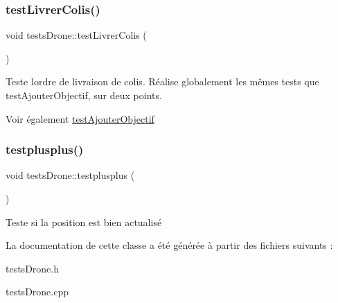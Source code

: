 \subsubsection{\texorpdfstring{test\+Livrer\+Colis()}{testLivrerColis()}}
{\footnotesize\ttfamily void tests\+Drone\+::test\+Livrer\+Colis (\begin{DoxyParamCaption}{ }\end{DoxyParamCaption})\hspace{0.3cm}{\ttfamily [protected]}}

Teste l\textquotesingle{}ordre de livraison de colis. Réalise globalement les mêmes tests que test\+Ajouter\+Objectif, sur deux points. \begin{DoxySeeAlso}{Voir également}
\mbox{\hyperlink{classtests_drone_add1f7248206bee9d8e61ec4b2cd0731e}{test\+Ajouter\+Objectif}} 
\end{DoxySeeAlso}
\mbox{\label{classtests_drone_a7f3e884cbe3c28c276d7e9bae2b8bd53}} 
\subsubsection{\texorpdfstring{testplusplus()}{testplusplus()}}
{\footnotesize\ttfamily void tests\+Drone\+::testplusplus (\begin{DoxyParamCaption}{ }\end{DoxyParamCaption})\hspace{0.3cm}{\ttfamily [protected]}}

Teste si la position est bien actualisé 

La documentation de cette classe a été générée à partir des fichiers suivants \+:\begin{DoxyCompactItemize}
\item 
tests\+Drone.\+h\item 
tests\+Drone.\+cpp\end{DoxyCompactItemize}
